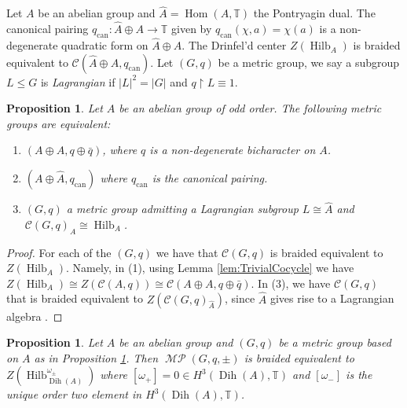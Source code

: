 \documentclass[twoside,11pt,reqno]{amsart}
\newtheorem{prop}[thm]{Proposition}
\theoremstyle{definition}
\theoremstyle{remark}
\newcommand{\cC}{\mathcal{C}}
\newcommand{\TT}{\mathbb{T}}
\DeclareMathOperator{\Hom}{Hom}
\DeclareMathOperator{\Dih}{Dih}
\DeclareMathOperator*{\MP}{\mathcal{MP}}
\DeclareMathOperator{\Vect}{Hilb}
\newcommand{\myemph}[1]{\emph{#1}}
\begin{document}
Let $A$ be an abelian group and $\hat A=\Hom(A,\TT)$ the Pontryagin dual. 
The canonical pairing $q_\mathrm{can}\colon \hat A \oplus A \to \TT$
given by $q_\mathrm{can}(\chi,a)=\chi(a)$ is a non-degenerate quadratic form on
$\hat A \oplus A$. 
The Drinfel'd center $Z(\Vect_A)$ is braided equivalent to 
$\cC(\hat A\oplus A,q_\mathrm{can})$.
Let $(G,q)$ be a metric group, we say a subgroup $L\leq G$ is 
\myemph{Lagrangian} if $|L|^2=|G|$ and  $q\restriction L \equiv 1$.
\begin{prop} 
  \label{prop:MetricDoubleGroups}
  Let $A$ be an abelian group of odd order. 
  The following metric groups are equivalent:
  \begin{enumerate}
    \item $(A\oplus A,q\oplus \bar q)$, where $q$ is a non-degenerate bicharacter on $A$.
    \item $(A\oplus \hat A,q_{\mathrm{can}})$ where $q_\mathrm{can}$ is the canonical pairing.
    \item $(G,q)$ a metric group admitting a Lagrangian subgroup $L\cong \hat A$ 
      and $\cC(G,q)_{A}\cong \Vect_A$.
  \end{enumerate}
\end{prop}
\begin{proof} 
  For each of the $(G,q)$ we have that $\cC(G,q)$ is braided equivalent to 
  $Z(\Vect_A)$.
  Namely, in (1), using  Lemma \ref{lem:TrivialCocycle} we have 
  $Z(\Vect_A)\cong Z(\cC(A,q))\cong \cC(A\oplus A,q\oplus \bar q)$. 
  In (3), we have $\cC(G,q)$ that is braided equivalent to 
  $Z(\cC(G,q)_{\hat A})$, since $\hat A$ gives rise to a Lagrangian algebra 
  \cite{DaMgNiOs2013}.
\end{proof}
\begin{prop} Let $A$ be an abelian group and $(G,q)$ be a metric group based on $A$ as in Proposition \ref{prop:MetricDoubleGroups}.
  Then $\MP(G,q,\pm)$ is braided equivalent to $Z(\Vect_{\Dih(A)}^{\omega_\pm})$
where $[\omega_+]=0\in H^3(\Dih(A),\TT)$ and $[\omega_-]$ is the unique order two element in $H^3(\Dih(A),\TT)$.
\end{prop}
\end{document}
